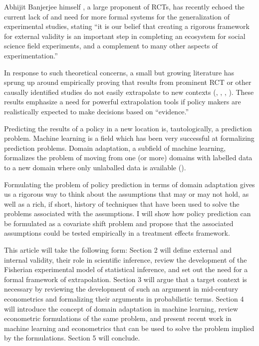 \documentclass[a4paper,12pt]{article}
\begin{document}
Abhijit Banjerjee himself \parencite{Snowberg2016}, a large proponent of RCTs, has recently echoed the current lack of and need for more formal systems for the generalization of experimental studies, stating ``it is our belief that creating a rigorous framework for external validity is an important step in completing an ecosystem for social science field experiments, and a complement to many other aspects of experimentation.''

In response to such theoretical concerns, a small but growing literature  has sprung up around empirically proving that results from prominent RCT or other causally identified studies do not easily extrapolate to new contexts (\cite{Pritchett2016}, \cite{Allcott2015}, \cite{Bisbee2017}, \cite{Rosenzweig2019}). These results emphasize a need for powerful extrapolation tools if policy makers are realistically expected to make decisions based on ``evidence.'' 

Predicting the results of a policy in a new location is, tautologically, a prediction problem. Machine learning is a field which has been very successful at formalizing prediction problems. Domain adaptation, a subfield of machine learning, formalizes the problem of moving from one (or more) domains with labelled data to a new domain where only unlaballed data is available (\cite[for a survey, see][]{Pan2010}).

Formulating the problem of policy prediction in terms of domain adaptation gives us a rigorous way to think about the assumptions that may or may not hold, as well as a rich, if short, history of techniques that have been used to solve the problems associated with the assumptions. I will show how policy prediction can be formulated as a covariate shift problem and propose that the associated assumptions could be tested empirically in a treatment effects framework. 

This article will take the following form: Section 2 will define external and internal validity, their role in scientific inference, review the development of the Fisherian experimental model of statistical inference, and set out the need for a formal framework of extrapolation. Section 3 will argue that a target context is necessary by reviewing the development of such an argument in mid-century econometrics and formalizing their arguments in probabilistic terms. Section 4 will introduce the concept of domain adaptation in machine learning, review econometric formulations of the same problem, and present recent work in machine learning and econometrics that can be used to solve the problem implied by the formulations. Section 5 will conclude.
\end{document}
